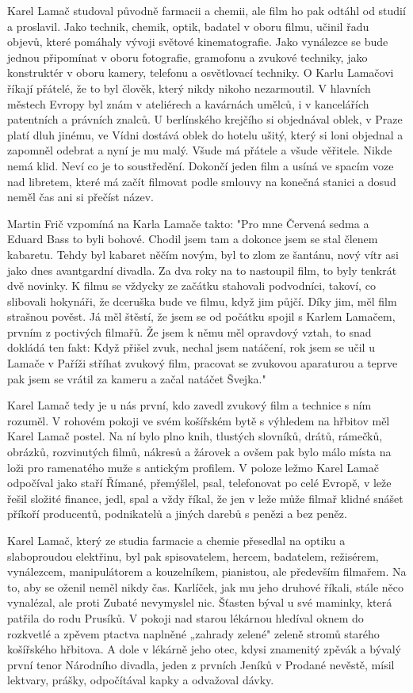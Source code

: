\documentclass[../dejiny-rodu-prusiku.tex]{subfiles}
\begin{document}
Karel Lamač studoval původně farmacii a chemii, ale film ho pak odtáhl od studií a proslavil. Jako technik, chemik, optik, badatel v oboru filmu, učinil řadu objevů, které pomáhaly vývoji světové kinematografie. Jako vynálezce se bude jednou připomínat v oboru fotografie, gramofonu a zvukové techniky, jako konstruktér v oboru kamery, telefonu a osvětlovací techniky. O Karlu Lamačovi říkají přátelé, že to byl člověk, který nikdy nikoho nezarmoutil. V hlavních městech Evropy byl znám v ateliérech a kavárnách umělců, i v kancelářích patentních a právních znalců. U berlínského krejčího si objednával oblek, v Praze platí dluh jinému, ve Vídni dostává oblek do hotelu ušitý, který si loni objednal a zapomněl odebrat a nyní je mu malý. Všude má přátele a všude věři­tele. Nikde nemá klid. Neví co je to soustředění. Dokončí jeden film a usíná ve spacím voze nad libretem, které má začít filmovat podle smlouvy na konečná stanici a dosud neměl čas ani si přečíst název.

Martin Frič vzpomíná na Karla Lamače takto: "Pro mne Červená sedma a Eduard Bass to byli bohové. Chodil jsem tam a dokonce jsem se stal členem kabaretu. Tehdy byl
kabaret něčím novým, byl to zlom ze šantánu, nový vítr asi jako dnes avantgardní divadla. Za dva roky na to nastoupil film, to byly tenkrát dvě novinky. K filmu se vždycky ze začátku stahovali podvodníci, takoví, co slibovali hokynáři, že dceruška bude ve filmu, když jim půjčí. Díky jim, měl film strašnou pověst. Já měl štěstí, že jsem se od počátku spojil s Karlem Lamačem, prvním z poctivých filmařů. Že jsem k němu měl oprav­dový vztah, to snad dokládá ten fakt: Když přišel zvuk, nechal jsem natáčení, rok jsem se učil u Lamače v Pa­říži stříhat zvukový film, pracovat se zvukovou apara­turou a teprve pak jsem se vrátil za kameru a začal natáčet Švejka."

Karel Lamač tedy je u nás první, kdo zavedl zvukový film a technice s ním rozuměl. V rohovém pokoji ve svém košířském bytě s výhledem na hřbitov měl Karel Lamač postel. Na ní bylo plno knih, tlustých slovníků, drátů, rámečků, obrázků, rozvinutých filmů, nákresů a žárovek a ovšem pak bylo málo místa na loži pro ramenatého muže s antickým profilem. V poloze ležmo Karel Lamač odpočíval jako staří Římané, přemýšlel, psal, telefo­novat po celé Evropě, v leže řešil složité finance, jedl, spal a vždy říkal, že jen v leže může filmař klidné snášet příkoří producentů, podnikatelů a jiných darebů s penězi a bez peněz.

Karel Lamač, který ze studia farmacie a chemie přesedlal na optiku a slaboproudou elektřinu, byl pak spisovatelem, hercem, badatelem, režisérem, vynálezcem, manipulátorem a kouzelníkem, pianistou, ale především filmařem. Na to, aby se oženil neměl nikdy čas. Karlíček, jak mu jeho druhové říkali, stále něco vynalézal, ale proti Zubaté nevymyslel nic. Šťasten býval u své maminky, která patřila do rodu Prusíků. V pokoji nad starou lékárnou hledíval oknem do rozkvetlé a zpěvem ptactva naplněné „zahrady zelené" zeleně stromů starého košířského hřbitova. A dole v lékárně jeho otec, kdysi znamenitý zpěvák a bývalý první tenor Národního divadla, jeden z prvních Jeníků v Prodané nevěstě, mísil lektvary, prášky, odpočítával kapky a odvažoval dávky.
\end{document}
